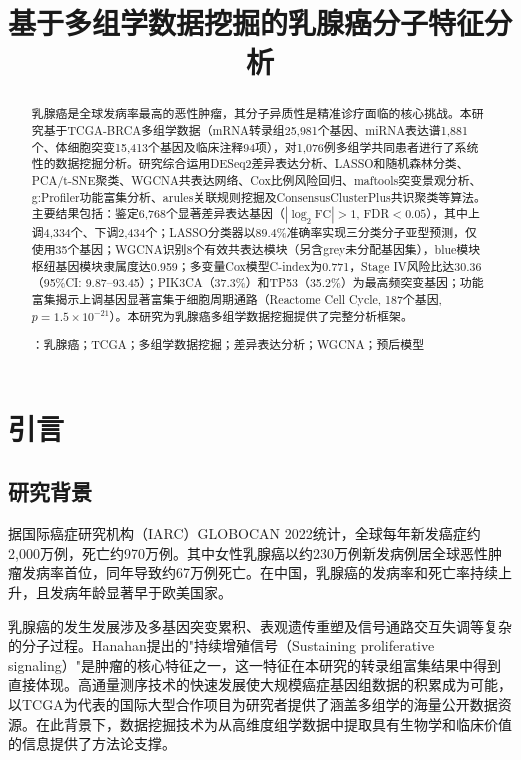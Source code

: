 \documentclass[12pt,a4paper,openany]{ctexbook}
\title{\heiti\zihao{3} 基于多组学数据挖掘的乳腺癌分子特征分析}
\author{}
\date{}
\begin{document}
\maketitle

\frontmatter
{}
\begin{abstract}
\noindent 乳腺癌是全球发病率最高的恶性肿瘤，其分子异质性是精准诊疗面临的核心挑战。本研究基于TCGA-BRCA多组学数据（mRNA转录组25,981个基因、miRNA表达谱1,881个、体细胞突变15,413个基因及临床注释94项），对1,076例多组学共同患者进行了系统性的数据挖掘分析。研究综合运用DESeq2差异表达分析、LASSO和随机森林分类、PCA/t-SNE聚类、WGCNA共表达网络、Cox比例风险回归、maftools突变景观分析、g:Profiler功能富集分析、arules关联规则挖掘及ConsensusClusterPlus共识聚类等算法。主要结果包括：鉴定6,768个显著差异表达基因（$|\log_2\text{FC}|>1$, FDR$<0.05$），其中上调4,334个、下调2,434个；LASSO分类器以89.4\%准确率实现三分类分子亚型预测，仅使用35个基因；WGCNA识别8个有效共表达模块（另含grey未分配基因集），blue模块枢纽基因模块隶属度达0.959；多变量Cox模型C-index为0.771，Stage IV风险比达30.36（95\%CI: 9.87--93.45）；PIK3CA（37.3\%）和TP53（35.2\%）为最高频突变基因；功能富集揭示上调基因显著富集于细胞周期通路（Reactome Cell Cycle, 187个基因, $p=1.5\times10^{-21}$）。本研究为乳腺癌多组学数据挖掘提供了完整分析框架。

\vspace{1em}
\vspace{1em}：乳腺癌；TCGA；多组学数据挖掘；差异表达分析；WGCNA；预后模型
\end{abstract}

\newpage
\tableofcontents
\newpage
\listoffigures
\newpage
\listoftables
\newpage
\mainmatter
{}
\setcounter{page}{1}
\chapter{引言}

\section{研究背景}
据国际癌症研究机构（IARC）GLOBOCAN 2022统计，全球每年新发癌症约2,000万例，死亡约970万例\cite{sung2024global}。其中女性乳腺癌以约230万例新发病例居全球恶性肿瘤发病率首位，同年导致约67万例死亡。在中国，乳腺癌的发病率和死亡率持续上升，且发病年龄显著早于欧美国家。

乳腺癌的发生发展涉及多基因突变累积、表观遗传重塑及信号通路交互失调等复杂的分子过程\cite{hanahan2011hallmarks}。Hanahan提出的"持续增殖信号（Sustaining proliferative signaling）"是肿瘤的核心特征之一\cite{hanahan2011hallmarks}，这一特征在本研究的转录组富集结果中得到直接体现。高通量测序技术的快速发展使大规模癌症基因组数据的积累成为可能，以TCGA\cite{tcga2012comprehensive}为代表的国际大型合作项目为研究者提供了涵盖多组学的海量公开数据资源。在此背景下，数据挖掘技术为从高维度组学数据中提取具有生物学和临床价值的信息提供了方法论支撑。
\end{document}
